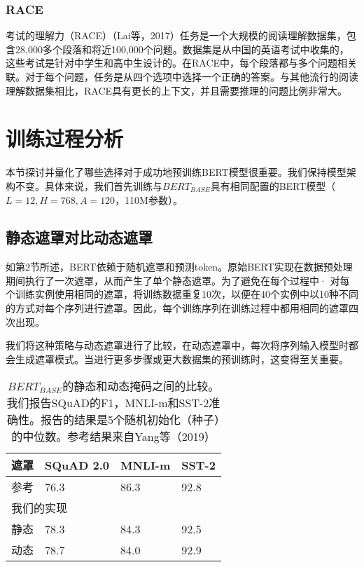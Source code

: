 \documentclass[lang=cn,11pt,a4paper,twocolumn]{elegantpaper}
\begin{document}
\subsubsection{RACE}
考试的理解力（RACE）（Lai等，2017）任务是一个大规模的阅读理解数据集，包含28,000多个段落和将近100,000个问题。数据集是从中国的英语考试中收集的，这些考试是针对中学生和高中生设计的。在RACE中，每个段落都与多个问题相关联。对于每个问题，任务是从四个选项中选择一个正确的答案。与其他流行的阅读理解数据集相比，RACE具有更长的上下文，并且需要推理的问题比例非常大。
\section{训练过程分析}
本节探讨并量化了哪些选择对于成功地预训练BERT模型很重要。我们保持模型架构不变。具体来说，我们首先训练与$BERT_{BASE}$具有相同配置的BERT模型（$L = 12,H = 768,A = 120$，110M参数）。
\subsection{静态遮罩对比动态遮罩}
如第2节所述，BERT依赖于随机遮罩和预测token。原始BERT实现在数据预处理期间执行了一次遮罩，从而产生了单个静态遮罩。为了避免在每个过程中· 对每个训练实例使用相同的遮罩，将训练数据重复10次，以便在40个实例中以10种不同的方式对每个序列进行遮罩。因此，每个训练序列在训练过程中都用相同的遮罩四次出现。

我们将这种策略与动态遮罩进行了比较，在动态遮罩中，每次将序列输入模型时都会生成遮罩模式。当进行更多步骤或更大数据集的预训练时，这变得至关重要。

\begin{table}[]
  \centering

  \begin{tabular}{llll}
  \hline
  遮罩 & \textbf{SQuAD 2.0} & \textbf{MNLI-m} & \textbf{SST-2} \\ \hline
  参考 & 76.3               & 86.3            & 92.8           \\ \hline
  \multicolumn{4}{l}{我们的实现}                                \\ 
  静态 & 78.3               & 84.3            & 92.5           \\ 
  动态 & 78.7               & 84.0            & 92.9           \\ \hline
  \end{tabular}
  \caption{$BERT_{BASE}$的静态和动态掩码之间的比较。我们报告SQuAD的F1，MNLI-m和SST-2准确性。报告的结果是5个随机初始化（种子）的中位数。参考结果来自Yang等（2019）}
  \end{table}
\end{document}
